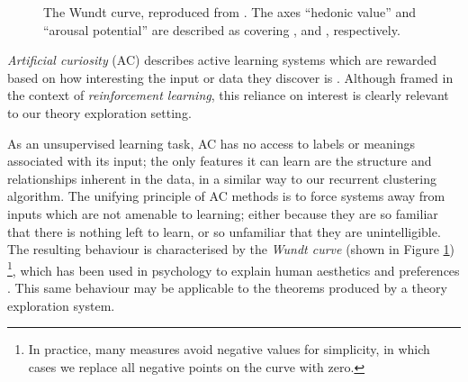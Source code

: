 \begin{figure}
  \centering

  \caption{The Wundt curve, reproduced from \citep{berlyne1970novelty}. The axes ``hedonic value'' and ``arousal potential'' are described as covering , and , respectively.}

  \label{fig:wundt}
\end{figure}

\emph{Artificial curiosity} (AC) describes active learning systems which are rewarded based on how interesting the input or data they discover is \citep{schmidhuber2006developmental}. Although framed in the context of \emph{reinforcement learning}, this reliance on interest is clearly relevant to our theory exploration setting.

As an unsupervised learning task, AC has no access to labels or meanings associated with its input; the only features it can learn are the structure and relationships inherent in the data, in a similar way to our recurrent clustering algorithm. The unifying principle of AC methods is to force systems away from inputs which are not amenable to learning; either because they are so familiar that there is nothing left to learn, or so unfamiliar that they are unintelligible. The resulting behaviour is characterised by the \emph{Wundt curve} (shown in Figure \ref{fig:wundt}) \footnote{In practice, many measures avoid negative values for simplicity, in which cases we replace all negative points on the curve with zero.}, which has been used in psychology to explain human aesthetics and preferences \citep{berlyne1970novelty}. This same behaviour may be applicable to the theorems produced by a theory exploration system.

